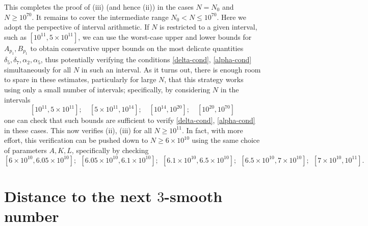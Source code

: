 \documentclass[10pt,a4paper,reqno]{amsart}
\numberwithin{equation}{section}
\theoremstyle{plain}
\theoremstyle{definition}
\begin{document}
This completes the proof of (iii) (and hence (ii)) in the cases $N=N_0$ and $N \geq 10^{70}$.  It remains to cover the intermediate range $N_0 < N \leq 10^{70}$.  Here we adopt the perspective of interval arithmetic.  If $N$ is restricted to a given interval, such as $[10^{11}, 5 \times 10^{11}]$, we can use the worst-case upper and lower bounds for $A_{p_1}, B_{p_1}$ to obtain conservative upper bounds on the most delicate quantities
$\delta_5, \delta_7, \alpha_2, \alpha_5$, thus potentially verifying the conditions \eqref{delta-cond}, \eqref{alpha-cond} simultaneously for all $N$ in such an interval.  As it turns out, there is enough room to spare in these estimates, particularly for large $N$, that this strategy works using only a small number of intervals; specifically, by considering $N$ in the intervals
$$ [10^{11}, 5 \times 10^{11}]; \quad [5 \times 10^{11}, 10^{14}]; \quad [10^{14}, 10^{20}]; \quad [10^{20}, 10^{70}]$$
one can check that such bounds are sufficient to verify \eqref{delta-cond}, \eqref{alpha-cond} in these cases.  This now verifies (ii), (iii) for all $N \geq 10^{11}$.
In fact, with more effort, this verification can be pushed down to $N \geq 6 \times 10^{10}$ using the same choice of parameters $A,K,L$, specifically by checking $$ [6 \times 10^{10}, 6.05 \times 10^{10}]; \ \  [6.05 \times 10^{10}, 6.1 \times 10^{10}]; \ \  [6.1 \times 10^{10}, 6.5 \times 10^{10}]; \ \  [6.5 \times 10^{10}, 7 \times 10^{10}]; \ \  [7 \times 10^{10}, 10^{11}].$$

\appendix

\section{Distance to the next \texorpdfstring{$3$}{3}-smooth number}\label{power-sec}
\end{document}
